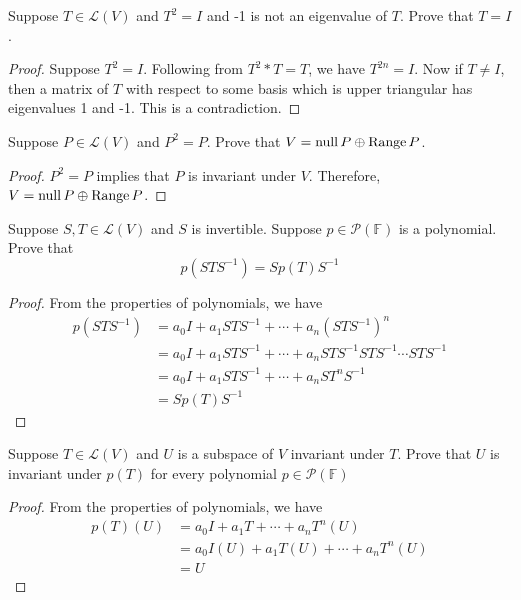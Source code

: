 \begin{exercise}
Suppose $T \in \mathcal{L}(V)$ and $T^{2} = I$ and -1 is not an eigenvalue of $T$. Prove that $T = I$.
\end{exercise}
\begin{proof}
	Suppose $T^{2} = I$. Following from $T^{2}* T = T$, we have $T^{2n} = I$. Now if $T \neq I$, then a matrix of $T$ with respect to some basis which is upper triangular has eigenvalues 1 and -1. This is a contradiction.
\end{proof}

\begin{exercise}
Suppose $P \in \mathcal{L}(V)$ and $P^{2} = P$. Prove that $V = \mathop{\mathrm{null}} P \oplus \operatorname{Range} P$.
\end{exercise}
\begin{proof}
	$P^{2} = P$ implies that $P$ is invariant under $V$. Therefore, $V = \mathop{\mathrm{null}} P \oplus \operatorname{Range} P$.
\end{proof}

\begin{exercise}
Suppose $S,T \in \mathcal{L}(V)$ and $S$ is
invertible. Suppose $p \in \mathcal{P}(\mathbb{F})$
is a polynomial. Prove that\[
	p(STS^{-1}) = Sp(T)S^{-1}\]
\end{exercise}
\begin{proof}
	From the properties of polynomials, we have
	\begin{equation*}
		\begin{aligned}
			p(STS^{-1}) & = a_0I + a_1STS^{-1} + \cdots + a_n(STS^{-1})^{n}                   \\
			            & = a_0I + a_1STS^{-1} + \cdots + a_nSTS^{-1}STS^{-1} \cdots STS^{-1} \\
			            & = a_0I + a_1STS^{-1} + \cdots + a_nST^{n}S^{-1}                     \\
			            & = Sp(T)S^{-1}
		\end{aligned}
	\end{equation*}
\end{proof}

\begin{exercise}
Suppose $T \in \mathcal{L}(V)$ and $U$ is a subspace of $V$ invariant under $T$. Prove that $U$ is invariant under $p(T)$ for every polynomial $p \in \mathcal{P}(\mathbb{F})$
\end{exercise}
\begin{proof}
	From the properties of polynomials, we have
	\begin{equation*}
		\begin{aligned}
			p(T)(U) & = a_0I + a_1T + \cdots + a_nT^{n}(U)       \\
			        & = a_0I(U) + a_1T(U) + \cdots + a_nT^{n}(U) \\
			        & = U
		\end{aligned}
	\end{equation*}
\end{proof}

